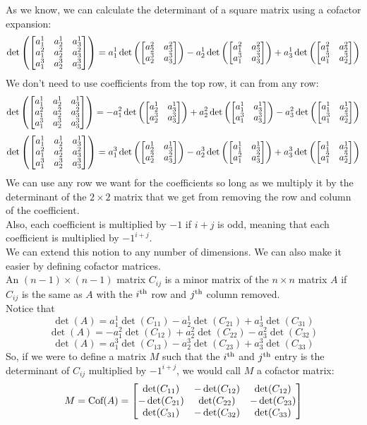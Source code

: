 \documentclass[12pt]{article}
\begin{document}
As we know, we can calculate the determinant
of a square matrix using a cofactor expansion:
\[ \det \left(  \begin{bmatrix} {a_1^1} & {a_2^1} 
& {a_3^1} \\ {a_1^2} & {a_2^2} & {a_3^2} \\ 
{a_1^3} & {a_2^3} & {a_3^3} \end{bmatrix}  \right)
= a_1^1 \det\left(  \begin{bmatrix} {a_2^2} & {a_3^2} \\
{a_2^3} & {a_3^3} \end{bmatrix} \right)
- a_2^1 \det\left( \begin{bmatrix} {a_1^2} & {a_3^2} \\
{a_1^3} & {a_3^3} \end{bmatrix} \right)
+ a_3^1 \det\left( \begin{bmatrix} {a_1^2} & {a_2^2} \\
{a_1^3} & {a_2^3} \end{bmatrix} \right) \]
We don't need to use coefficients from the top
row, it can from any row:
\[ \det \left(  \begin{bmatrix} {a_1^1} & {a_2^1} & 
{a_3^1} \\ {a_1^2} & {a_2^2} & {a_3^2} \\
{a_1^3} & {a_2^3} & {a_3^3} \end{bmatrix}  \right)
= -a_1^2 \det\left(  \begin{bmatrix} {a_2^1} & {a_3^1} \\
{a_2^3} & {a_3^3} \end{bmatrix} \right)
+ a_2^2 \det\left( \begin{bmatrix} {a_1^1} & {a_3^1} \\
{a_1^3} & {a_3^3} \end{bmatrix} \right)
- a_3^2 \det\left( \begin{bmatrix} {a_1^1} & {a_2^1} \\
{a_1^3} & {a_2^3} \end{bmatrix} \right) \]
\[ \det \left(  \begin{bmatrix} {a_1^1} & {a_2^1} & {a_3^1} \\
{a_1^2} & {a_2^2} & {a_3^2} \\{a_1^3} & 
{a_2^3} & {a_3^3} \end{bmatrix}  \right)
= a_1^3 \det\left( \begin{bmatrix} {a_2^1} & {a_3^1} \\
{a_2^2} & {a_3^2} \end{bmatrix} \right)
- a_2^3 \det\left( \begin{bmatrix} {a_1^1} & {a_3^1} \\
{a_1^2} & {a_3^2} \end{bmatrix} \right)
+ a_3^3 \det\left( \begin{bmatrix} {a_1^1} & {a_2^1} \\
{a_1^2} & {a_2^2} \end{bmatrix} \right) \]
We can use any row we want for the coefficients
so long as we multiply it by the determinant
of the $2 \times 2$ matrix that we get from
removing the row and column of the coefficient. \\
Also, each coefficient is multiplied
by $-1$ if $i+j$ is odd,
meaning that each coefficient is multiplied
by $-1^{i+j}$. \\

We can extend this notion to any number of dimensions.
We can also make it easier by defining
cofactor matrices. \\
An $(n-1)\times (n-1)$ matrix $C_{ij}$
is a minor matrix of the $n \times n$ matrix $A$
if $C_{ij}$ is the same as $A$ with 
the $i^{\text{th}}$ row and $j^{\text{th}}$ column removed. \\
Notice that
\[ \det(A) = a_1^1 \det(C_{11})
- a_2^1 \det(C_{21}) + a_3^1 \det(C_{31}) \]
\[ \det(A) = -a_1^2 \det(C_{12})
+ a_2^2 \det(C_{22}) - a_3^2 \det(C_{32}) \]
\[ \det(A) = a_1^3 \det(C_{13})
- a_2^3 \det(C_{23}) + a_3^3 \det(C_{33}) \]
So, if we were to define a matrix $M$
such that the $i^{\text{th}}$ and $j^{\text{th}}$
entry is the determinant of $C_{ij}$
multiplied by $-1^{i+j}$,
we would call $M$ a cofactor matrix:
\[ M = \text{Cof}(A) = 
\begin{bmatrix} {\det(C_{11})} & {-\det(C_{12})} & {\det(C_{12})} \\
{-\det(C_{21})} & {\det(C_{22})} & {-\det(C_{23})} \\
{\det(C_{31})} & {-\det(C_{32})} & {\det(C_{33})} \end{bmatrix} \]
\end{document}
